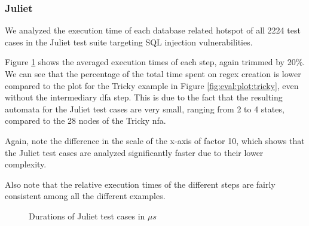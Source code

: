 \subsubsection{Juliet}

We analyzed the execution time of each database related hotspot of all 2224 test cases in the Juliet test suite targeting SQL injection vulnerabilities.

Figure \ref{fig:eval:plot:juliet} shows the averaged execution times of each step, again trimmed by 20\%.
We can see that the percentage of the total time spent on regex creation is lower compared to the plot for the Tricky example in Figure \ref{fig:eval:plot:tricky}, even without the intermediary \ac{dfa} step. This is due to the fact that the resulting automata for the Juliet test cases are very small, ranging from 2 to 4 states, compared to the 28 nodes of the Tricky \ac{nfa}.

Again, note the difference in the scale of the x-axis of factor 10, which shows that the Juliet test cases are analyzed significantly faster due to their lower complexity.

Also note that the relative execution times of the different steps are fairly consistent among all the different examples.


\begin{figure}
	\caption{Durations of Juliet test cases in $\mu s$}
	\label{fig:eval:plot:juliet}
\end{figure}

